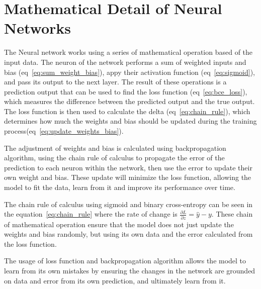 \documentclass[a4paper,10pt]{article}
\begin{document}
\section{Mathematical Detail of Neural Networks}

The Neural network works using a series of mathematical operation based of the input data.
The neuron of the network performs a sum of weighted inputs and bias (eq~\ref{eq:sum_weight_bias}), appy their activation function (eq~\ref{eq:sigmoid}), and pass its output to the next layer.
The result of these operations is a prediction output that can be used to find the loss function (eq~\ref{eq:bce_loss}), which measures the difference between the predicted output and the true output.
The loss function is then used to calculate the delta (eq~\ref{eq:chain_rule}), which determines how much the weights and bias should be updated during the training process(eq~\ref{eq:update_weights_bias}).

The adjustment of weights and bias is calculated using backpropagation algorithm, using the chain rule of calculus to propagate the error of the prediction to each neuron within the network, then use the error to update their own weight and bias.
These update will minimize the loss function, allowing the model to fit the data, learn from it and improve its performance over time.

The chain rule of calculus using sigmoid and binary cross-entropy can be seen in the equation~\ref{eq:chain_rule} where the rate of change is $\frac{\partial L}{\partial z} = \hat{y} - y$.
These chain of mathematical operation ensure that the model does not just update the weights and bias randomly, but using its own data and the error calculated from the loss function.

The usage of loss function and backpropagation algorithm allows the model to learn from its own mistakes by ensuring the changes in the network are grounded on data and error from its own prediction, and ultimately learn from it.
\end{document}
